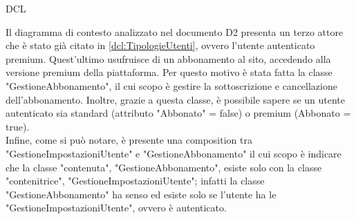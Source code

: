 \begin{listaPersonale}{DCL}
\begin{listaPersonale2}[DCL]{}
        \begin{center}
            
        \end{center}
        \newpage


        Il diagramma di contesto analizzato nel documento D2 presenta un terzo attore che è stato già citato in \ref{dcl:TipologieUtenti}, ovvero l'utente autenticato premium. Quest'ultimo usufruisce di un abbonamento al sito, accedendo alla versione premium della piattaforma. Per questo motivo è stata fatta la classe "GestioneAbbonamento", il cui scopo è gestire la sottoscrizione e cancellazione dell'abbonamento. Inoltre, grazie a questa classe, è possibile sapere se un utente autenticato sia standard (attributo "Abbonato" = false) o premium (Abbonato = true). \\
        Infine, come si può notare, è presente una composition tra "GestioneImpostazioniUtente" e "GestioneAbbonamento" il cui scopo è indicare che la classe "contenuta", "GestioneAbbonamento", esiste solo con la classe "contenitrice", "GestioneImpostazioniUtente"; infatti la classe "GestioneAbbonamento" ha senso ed esiste solo se l'utente ha le "GestioneImpostazioniUtente", ovvero è autenticato.


        \begin{center}
            
        \end{center}




\end{listaPersonale2}
\end{listaPersonale}
